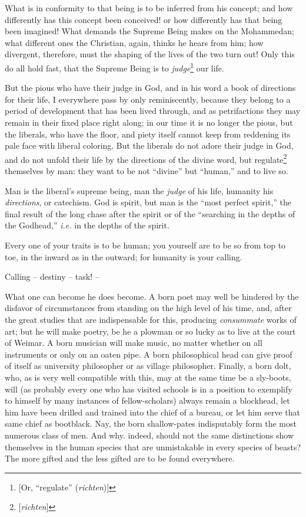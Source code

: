 \documentclass[12pt,a4paper]{book}
\begin{document}
What is in conformity to that being is to be inferred from his concept; and 
how differently has this concept been conceived! or how differently has that 
being been imagined! What demands the Supreme Being makes on the Mohammedan; 
what different ones the Christian, again, thinks he hears from him; how 
divergent, therefore, must the shaping of the lives of the two turn out! Only 
this do all hold fast, that the Supreme Being is to 
\textit{judge}\footnote{[Or, ``regulate'' (\textit{richten})]} our life.

But the pious who have their judge in God, and in his word a book of 
directions for their life, I everywhere pass by only reminiscently, because 
they belong to a period of development that has been lived through, and as 
petrifactions they may remain in their fixed place right along; in our time it 
is no longer the pious, but the liberals, who have the floor, and piety itself 
cannot keep from reddening its pale face with liberal coloring. But the 
liberals do not adore their judge in God, and do not unfold their life by the 
directions of the divine word, but regulate\footnote{[\textit{richten}]} 
themselves by man: they want to be not ``divine'' but ``human,'' and to 
live so.

Man is the liberal's supreme being, man the \textit{judge} of his life, 
humanity his \textit{directions}, or catechism. God is spirit, but man is the 
``most perfect spirit,'' the final result of the long chase after the spirit 
or of the ``searching in the depths of the Godhead,'' \textit{i.e.} in the 
depths of the spirit.

Every one of your traits is to be human; you yourself are to be so from top to 
toe, in the inward as in the outward; for humanity is your calling.

Calling -- destiny -- task! --

What one can become he does become. A born poet may well be hindered by the 
disfavor of circumstances from standing on the high level of his time, and, 
after the great studies that are indispensable for this, producing 
\textit{consummate} works of art; but he will make poetry, be he a plowman or 
so lucky as to live at the court of Weimar. A born musician will make music, 
no matter whether on all instruments or only on an oaten pipe. A born 
philosophical head can give proof of itself as university philosopher or as 
village philosopher. Finally, a born dolt, who, as is very well compatible 
with this, may at the same time be a sly-boots, will (as probably every one 
who has visited schools is in a position to exemplify to himself by many 
instances of fellow-scholars) always remain a blockhead, let him have been 
drilled and trained into the chief of a bureau, or let him serve that same 
chief as bootblack. Nay, the born shallow-pates indisputably form the most 
numerous class of men. And why. indeed, should not the same distinctions show 
themselves in the human species that are unmistakable in every species of 
beasts? The more gifted and the less gifted are to be found everywhere.
\end{document}
